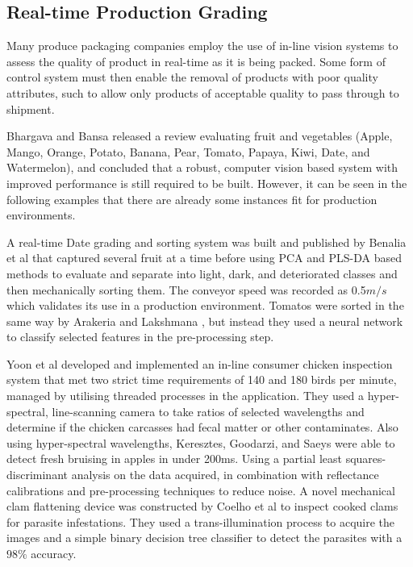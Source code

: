 \documentclass[conference]{IEEEtran}
\begin{document}
\subsection{Real-time Production Grading}

Many produce packaging companies employ the use of in-line vision systems to assess the quality of product in real-time as it is 
being packed. Some form of control system must then enable the removal of products with poor quality attributes, such to allow only products of acceptable quality to pass through to shipment. 

Bhargava and Bansa \cite{bhargava} released a review evaluating fruit and vegetables (Apple, Mango, Orange, Potato, Banana, Pear, Tomato, Papaya, Kiwi, Date, and Watermelon), and concluded that a robust, computer vision based system with improved performance is still required to be built. However, it can be seen in the following examples that there are already some instances fit for production environments.

A real-time Date grading and sorting system was built and published by Benalia et al \cite{benalia} that captured several fruit at a time before using PCA and PLS-DA based methods to evaluate and separate into light, dark, and deteriorated classes and then mechanically sorting them. The conveyor speed was recorded as 0.5$m/s$ which validates its use in a production environment. Tomatos were sorted in the same way by Arakeria and Lakshmana \cite{arakeria}, but instead they used a neural network to classify selected features in the pre-processing step. 

Yoon et al \cite{yoon} developed and implemented an in-line consumer chicken inspection system that met two strict time requirements of 140 and 180 birds per minute, managed by utilising threaded processes in the application. They used a hyper-spectral, line-scanning camera to take ratios of selected wavelengths and determine if the chicken carcasses had fecal matter or other contaminates. Also using hyper-spectral wavelengths, Keresztes, Goodarzi, and Saeys \cite{keresztes} were able to detect fresh bruising in apples in under 200ms. Using a partial least squares-discriminant analysis on the data acquired, in combination with reflectance calibrations and pre-processing techniques to reduce noise. A novel mechanical clam flattening device was constructed by Coelho et al \cite{coelho} to inspect cooked clams for parasite infestations. They used a trans-illumination process to acquire the images and a simple binary decision tree classifier to detect the parasites with a $98\%$ accuracy.
\end{document}
